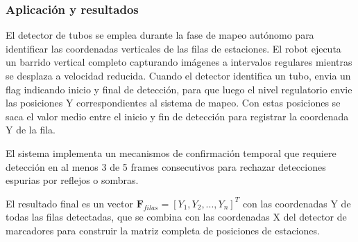\subsubsection{Aplicación y resultados}

El detector de tubos se emplea durante la fase de mapeo autónomo para identificar las coordenadas verticales de las filas de estaciones. El robot ejecuta un barrido vertical completo capturando imágenes a intervalos regulares mientras se desplaza a velocidad reducida. Cuando el detector identifica un tubo, envia un flag indicando inicio y final de detección, para que luego el nivel regulatorio envie las posiciones Y correspondientes al sistema de mapeo. Con estas posiciones se saca el valor medio entre el inicio y fin de detección para registrar la coordenada Y de la fila.

El sistema implementa un mecanismos de confirmación temporal que requiere detección en al menos 3 de 5 frames consecutivos para rechazar detecciones espurias por reflejos o sombras.

El resultado final es un vector $\mathbf{F}_{filas} = [Y_1, Y_2, ..., Y_n]^T$ con las coordenadas Y de todas las filas detectadas, que se combina con las coordenadas X del detector de marcadores para construir la matriz completa de posiciones de estaciones.
